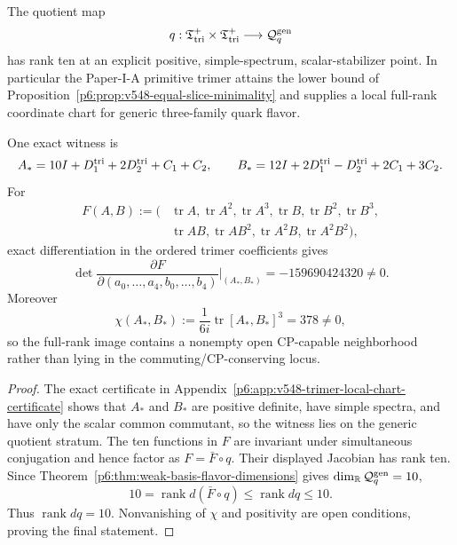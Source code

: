 \documentclass[11pt,a4paper]{article}
\begin{document}
\begin{theorem}
\label{p6:thm:v548-trimer-local-submersion}
The quotient map
\[
 q:\mathfrak T_{\rm tri}^{+}\times\mathfrak T_{\rm tri}^{+}
 \longrightarrow\mathcal Q_q^{\rm gen}
\]
has rank ten at an explicit positive, simple-spectrum, scalar-stabilizer
point.  In particular the Paper-I-A primitive trimer attains the lower bound of
Proposition~\ref{p6:prop:v548-equal-slice-minimality} and supplies a local
full-rank coordinate chart for generic three-family quark flavor.

One exact witness is
\[
 A_*=10I+D^{\mathrm{tri}}_1+2D^{\mathrm{tri}}_2+C_1+C_2,
 \qquad
 B_*=12I+2D^{\mathrm{tri}}_1-D^{\mathrm{tri}}_2+2C_1+3C_2.
\]
For
\[
\begin{aligned}
F(A,B):=(&\operatorname{tr}A,\operatorname{tr}A^2,\operatorname{tr}A^3,
\operatorname{tr}B,\operatorname{tr}B^2,\operatorname{tr}B^3,\\
&\operatorname{tr}AB,\operatorname{tr}AB^2,
\operatorname{tr}A^2B,\operatorname{tr}A^2B^2),
\end{aligned}
\]
exact differentiation in the ordered trimer coefficients gives
\[
 \boxed{
 \det\frac{\partial F}
 {\partial(a_0,\ldots,a_4,b_0,\ldots,b_4)}\bigg|_{(A_*,B_*)}
 =-159690424320\ne0.}
\]
Moreover
\[
 \boxed{
 \chi(A_*,B_*):=\frac1{6i}\operatorname{tr}[A_*,B_*]^3=378\ne0,}
\]
so the full-rank image contains a nonempty open CP-capable neighborhood rather
than lying in the commuting/CP-conserving locus.
\end{theorem}
\begin{proof}
The exact certificate in
Appendix~\ref{p6:app:v548-trimer-local-chart-certificate} shows that $A_*$ and
$B_*$ are positive definite, have simple spectra, and have only the scalar
common commutant, so the witness lies on the generic quotient stratum.  The
ten functions in $F$ are invariant under simultaneous conjugation and hence
factor as $F=\bar F\circ q$.  Their displayed Jacobian has rank ten.  Since
Theorem~\ref{p6:thm:weak-basis-flavor-dimensions} gives
$\dim_{\mathbb{R}}\mathcal Q_q^{\rm gen}=10$,
\[
 10=\operatorname{rank}d(\bar F\circ q)
 \le\operatorname{rank}dq\le10.
\]
Thus $\operatorname{rank}dq=10$.  Nonvanishing of $\chi$ and positivity are
open conditions, proving the final statement.
\end{proof}
\end{document}
